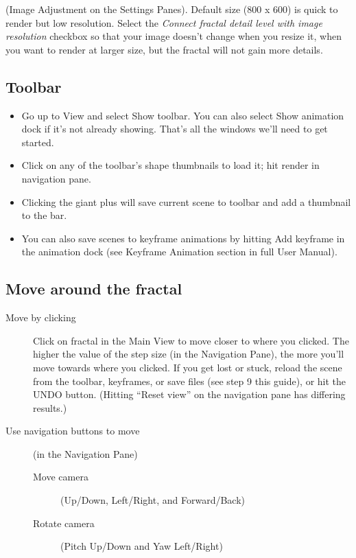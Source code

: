 (Image Adjustment on the Settings Panes). Default size (800 x 600) is quick to render but low resolution. Select the \emph{Connect fractal detail level with image resolution} checkbox so that your image doesn’t change when you resize it, when you want to render at larger size, but the fractal will not gain more details. 

\subsection{Toolbar}\label{qsg-toolbar}


\begin{itemize}
	\item Go up to View and select Show toolbar. You can also select Show animation dock if it’s not already showing. That’s all the windows we’ll need to get started.
    \item Click on any of the toolbar’s shape thumbnails to load it; hit render in navigation pane.
    \item Clicking the giant plus will save current scene to toolbar and add a thumbnail to the bar. 
    \item You can also save scenes to keyframe animations by hitting Add keyframe in the animation dock (see Keyframe Animation section in full User Manual). 

\end{itemize}

\subsection{Move around the fractal}\label{qsg-move-around}
\begin{description}
	\item[Move by clicking] Click on fractal in the Main View to move closer to where you clicked. The higher the value of the step size (in the Navigation Pane), the more you’ll move towards where you clicked. If you get lost or stuck, reload the scene from the toolbar, keyframes, or save files (see step 9 this guide), or hit the UNDO button. (Hitting “Reset view” on the navigation pane has differing results.)
	
    \item[Use navigation buttons to move] (in the Navigation Pane)
    
    \begin{description}
           \item[Move camera] (Up/Down, Left/Right, and Forward/Back)
    		\item[Rotate camera] (Pitch Up/Down and Yaw Left/Right)
    \end{description}
\end{description}

